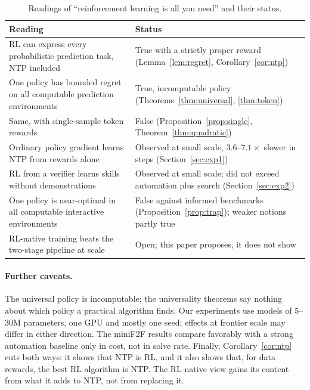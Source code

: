 \documentclass[11pt]{article}
\theoremstyle{definition}
\begin{document}
\begin{table}[t]
\centering
\caption{Readings of ``reinforcement learning is all you need'' and their status.}\label{tab:notions}
\small
\begin{tabular}{>{\raggedright}p{7.6cm}>{\raggedright\arraybackslash}p{6.8cm}}
\toprule
Reading & Status \\
\midrule
RL can express every probabilistic prediction task, NTP included & True with a strictly proper reward (Lemma~\ref{lem:regret}, Corollary~\ref{cor:ntp}) \\
One policy has bounded regret on all computable prediction environments & True, incomputable policy (Theorems~\ref{thm:universal}, \ref{thm:token}) \\
Same, with single-sample token rewards & False (Proposition~\ref{prop:single}, Theorem~\ref{thm:quadratic}) \\
Ordinary policy gradient learns NTP from rewards alone & Observed at small scale, $3.6$--$7.1\times$ slower in steps (Section~\ref{sec:exp1}) \\
RL from a verifier learns skills without demonstrations & Observed at small scale; did not exceed automation plus search (Section~\ref{sec:exp2}) \\
One policy is near-optimal in all computable interactive environments & False against informed benchmarks (Proposition~\ref{prop:trap}); weaker notions partly true~\cite{lattimore2011asymptotic,leike2016thompson} \\
RL-native training beats the two-stage pipeline at scale & Open; this paper proposes, it does not show \\
\bottomrule
\end{tabular}
\end{table}

\paragraph{Further caveats.} The universal policy is incomputable; the universality theorems say nothing about which policy a practical algorithm finds. Our experiments use models of $5$--$30$M parameters, one GPU and mostly one seed; effects at frontier scale may differ in either direction. The miniF2F results compare favorably with a strong automation baseline only in cost, not in solve rate. Finally, Corollary~\ref{cor:ntp} cuts both ways: it shows that NTP is RL, and it also shows that, for data rewards, the best RL algorithm is NTP. The RL-native view gains its content from what it adds to NTP, not from replacing it.
\end{document}
